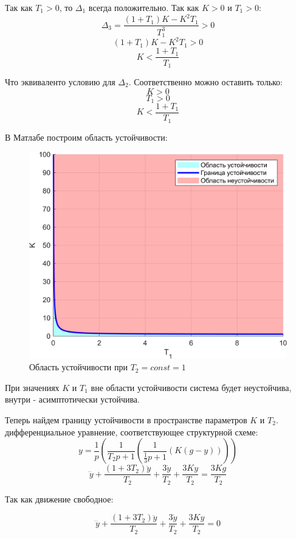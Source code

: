 Так как \( T_1 > 0 \), то \(\Delta_1\) всегда положительно. Так как \( K > 0 \) и \( T_1 > 0 \):
\[
\Delta_3 = \frac{(1+T_1)K - K^2 T_1}{T_1^3} > 0
\]
\[
    (1+T_1)K - K^2 T_1 > 0
\]
\[
    K < \frac{1+T_1}{T_1}
\]

Что эквиваленто условию для $\Delta_2$. Соответственно можно оставить только:
\[
    K > 0
\]
\[
    T_1 > 0
\]
\[
    K < \frac{1+T_1}{T_1}
\]

В Матлабе построим область устойчивости:
\begin{figure}[H]
    \centering
    \includegraphics[width=1\textwidth]{../images/2_1.png}
    \caption{Область устойчивости при \( T_2 = const = 1 \)}
\end{figure}

При значениях \( K \) и \( T_1 \) вне области устойчивости система будет неустойчива, 
внутри - асимптотически устойчива.

Теперь найдем границу устойчивости в пространстве параметров \( K \) и \( T_2 \).
дифференциальное уравнение, соответствующее структурной схеме:
\[
y = \frac{1}{p} \left( \frac{1}{T_2p + 1} \left( \frac{1}{\frac{1}{3}p + 1} \left( K(g - y) \right) \right) \right)
\]
\[
\dddot y + \frac{(1 + 3T_2) \ddot y}{T_2} + \frac{3\dot y}{T_2} + \frac{3 K y}{T_2} = \frac{3Kg}{T_2}
\]

Так как движение свободное:

\[
    \dddot y + \frac{(1 + 3T_2) \ddot y}{T_2} + \frac{3\dot y}{T_2} + \frac{3 K y}{T_2} = 0
\]

